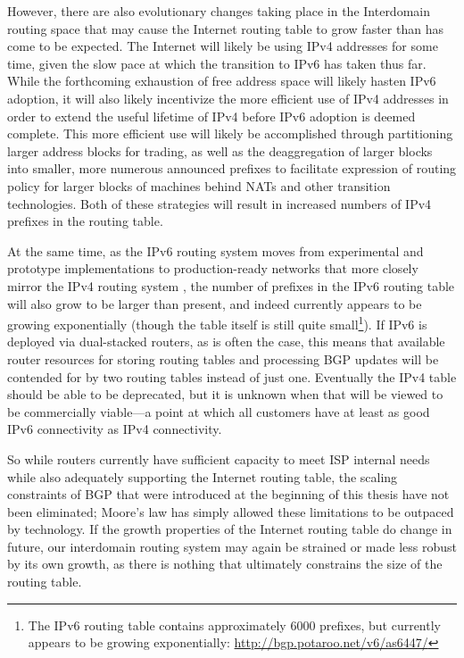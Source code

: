 However, there are also evolutionary changes taking place in the Interdomain
routing space that may cause the Internet routing table to grow faster than has
come to be expected. The Internet will likely be using IPv4 addresses for some
time, given the slow pace at which the transition to IPv6 has taken thus far.
While the forthcoming exhaustion of free address space will likely hasten IPv6
adoption, it will also likely incentivize the more efficient use of IPv4
addresses in order to extend the useful lifetime of IPv4 before IPv6 adoption
is deemed complete. This more efficient use will likely be accomplished through
partitioning larger address blocks for trading, as well as the deaggregation of
larger blocks into smaller, more numerous announced prefixes to facilitate
expression of routing policy for larger blocks of machines behind NATs and
other transition technologies. Both of these strategies will result in
increased numbers of IPv4 prefixes in the routing table.

At the same time, as the IPv6 routing system moves from experimental and
prototype implementations to production-ready networks that more closely mirror
the IPv4 routing system \cite{Cowie:2010vn}, the number of prefixes in the IPv6
routing table will also grow to be larger than present, and indeed currently
appears to be growing exponentially (though the table itself is still quite
small\footnote{The IPv6 routing table contains approximately 6000 prefixes, but
currently appears to be growing exponentially:
\url{http://bgp.potaroo.net/v6/as6447/}}). If IPv6 is deployed via dual-stacked
routers, as is often the case, this means that available router resources for
storing routing tables and processing BGP updates will be contended for by two
routing tables instead of just one. Eventually the IPv4 table should be able to
be deprecated, but it is unknown when that will be viewed to be commercially
viable---a point at which all customers have at least as good IPv6 connectivity
as IPv4 connectivity.

So while routers currently have sufficient capacity to meet ISP internal needs
while also adequately supporting the Internet routing table, the scaling
constraints of BGP that were introduced at the beginning of this thesis have
not been eliminated; Moore's law has simply allowed these limitations to be
outpaced by technology. If the growth properties of the Internet routing table
do change in future, our interdomain routing system may again be strained or
made less robust by its own growth, as there is nothing that ultimately
constrains the size of the routing table.

